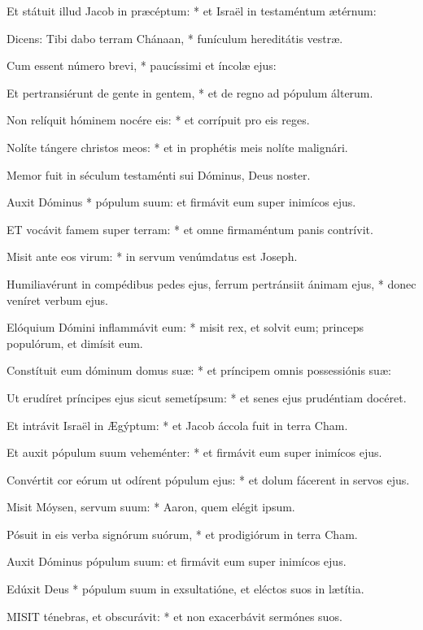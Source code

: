 Et státuit illud Jacob in præcéptum: * et Israël in testaméntum ætérnum:

Dicens: Tibi dabo terram Chánaan, * funículum hereditátis vestræ.

Cum essent número brevi, * paucíssimi et íncolæ ejus:

Et pertransiérunt de gente in gentem, * et de regno ad pópulum álterum.

Non relíquit hóminem nocére eis: * et corrípuit pro eis reges.

Nolíte tángere christos meos: * et in prophétis meis nolíte malignári.

 Memor fuit in séculum testaménti sui Dóminus, Deus noster.

 Auxit Dóminus * pópulum suum: et firmávit eum super inimícos ejus.


\lettrine[lines=2]{E}{T} vocávit famem super terram: * et omne firmaméntum panis contrívit.

Misit ante eos virum: * in servum venúmdatus est Joseph.

Humiliavérunt in compédibus pedes ejus, ferrum pertránsiit ánimam ejus, * donec veníret verbum ejus.

Elóquium Dómini inflammávit eum: * misit rex, et solvit eum; princeps populórum, et dimísit eum.

Constítuit eum dóminum domus suæ: * et príncipem omnis possessiónis suæ:

Ut erudíret príncipes ejus sicut semetípsum: * et senes ejus prudéntiam docéret.

Et intrávit Israël in Ægýptum: * et Jacob áccola fuit in terra Cham.

Et auxit pópulum suum veheménter: * et firmávit eum super inimícos ejus.

Convértit cor eórum ut odírent pópulum ejus: * et dolum fácerent in servos ejus.

Misit Móysen, servum suum: * Aaron, quem elégit ipsum.

Pósuit in eis verba signórum suórum, * et prodigiórum in terra Cham.

 Auxit Dóminus pópulum suum: et firmávit eum super inimícos ejus.

 Edúxit Deus * pópulum suum in exsultatióne, et eléctos suos in lætítia.


\lettrine[lines=2]{M}{ISIT} ténebras, et obscurávit: * et non exacerbávit sermónes suos.

